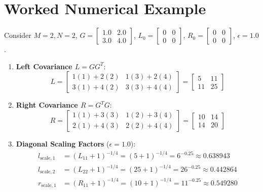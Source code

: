 \documentclass[11pt,a4paper]{article}
\theoremstyle{definition}
\begin{document}
\section{Worked Numerical Example}

Consider $M=2, N=2$, $G = \begin{bmatrix} 1.0 & 2.0 \\ 3.0 & 4.0 \end{bmatrix}$, $L_0 = \begin{bmatrix} 0 & 0 \\ 0 & 0 \end{bmatrix}$, $R_0 = \begin{bmatrix} 0 & 0 \\ 0 & 0 \end{bmatrix}$, $\epsilon = 1.0$.

\begin{enumerate}
    \item \textbf{Left Covariance $L = G G^T$}:
    \begin{equation}
    L = \begin{bmatrix} 1(1) + 2(2) & 1(3) + 2(4) \\ 3(1) + 4(2) & 3(3) + 4(4) \end{bmatrix} = \begin{bmatrix} 5 & 11 \\ 11 & 25 \end{bmatrix}
    \end{equation}
    \item \textbf{Right Covariance $R = G^T G$}:
    \begin{equation}
    R = \begin{bmatrix} 1(1) + 3(3) & 1(2) + 3(4) \\ 2(1) + 4(3) & 2(2) + 4(4) \end{bmatrix} = \begin{bmatrix} 10 & 14 \\ 14 & 20 \end{bmatrix}
    \end{equation}
    \item \textbf{Diagonal Scaling Factors} ($\epsilon = 1.0$):
    \begin{align}
    l_{\text{scale}, 1} &= (L_{11} + 1)^{-1/4} = (5 + 1)^{-1/4} = 6^{-0.25} \approx 0.638943 \\
    l_{\text{scale}, 2} &= (L_{22} + 1)^{-1/4} = (25 + 1)^{-1/4} = 26^{-0.25} \approx 0.442864 \\
    r_{\text{scale}, 1} &= (R_{11} + 1)^{-1/4} = (10 + 1)^{-1/4} = 11^{-0.25} \approx 0.549280 \\

\end{align}
\end{enumerate}
\end{document}
